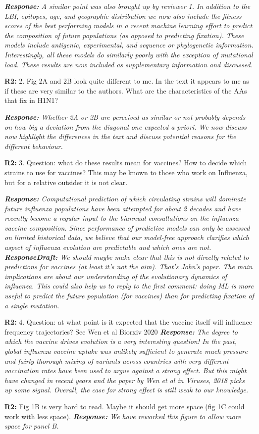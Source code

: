 \documentclass[aps,rmp,onecolumn]{revtex4-1}
\newcommand{\refb}[1]{\textbf{R2:} #1\vskip 5mm}
\newcommand{\response}[1]{{\it {\color{response}\textbf{Response:} #1}}\vskip 5mm}
\newcommand{\responsedraft}[1]{{\it {\color{purple}\textbf{ResponseDraft:} #1}}\vskip 5mm}
\begin{document}
\response{
	A similar point was also brought up by reviewer 1.
	In addition to the LBI, epitopes, age, and geographic distribution we now also include the fitness scores of the best performing models in a recent machine learning effort to predict the composition of future populations (as opposed to predicting fixation).
	These models include antigenic, experimental, and sequence or phylogenetic information.
	Interestingly, all these models do similarly poorly with the exception of mutational load.
	These results are now included as supplementary information and discussed.
}

\refb{2. Fig 2A and 2B look quite different to me. In the text it appears to me as if these are very similar to the authors. What are the characteristics of the AAs that fix in H1N1? }

\response{Whether 2A or 2B are perceived as similar or not probably depends on how big a deviation from the diagonal one expected a priori.
We now discuss now highlight the differences in the text and discuss potential reasons for the different behaviour.  }

\refb{3. Question: what do these results mean for vaccines? How to decide which strains to use for vaccines? This may be known to those who work on Influenza, but for a relative outsider it is not clear. }

\response{
	Computational prediction of which circulating strains will dominate future influenza populations have been attempted for about 2 decades and have recently become a regular input to the biannual consultations on the influenza vaccine composition.
	Since performance of predictive models can only be assessed on limited historical data, we believe that our model-free approach clarifies which aspect of influenza evolution are predictable and which ones are not.
}
\responsedraft{We should maybe make clear that this is not directly related to predictions for vaccines (at least it's not the aim). 
That's John's paper. 
The main implications are about our understanding of the evolutionary dynamics of influenza. 
This could also help us to reply to the first comment: doing ML is more useful to predict the future population (for vaccines) than for predicting fixation of a single mutation. }

\refb{4. Question: at what point is it expected that the vaccine itself will influence frequency trajectories? See Wen et al Biorxiv 2020}
\response{
	The degree to which the vaccine drives evolution is a very interesting question!
	In the past, global influenza vaccine uptake was unlikely sufficient to generate much pressure and fairly thorough mixing of variants across countries with very different vaccination rates have been used to argue against a strong effect. But this might have changed in recent years and the paper by Wen et al in Viruses, 2018 picks up some signal.
	Overall, the case for strong effect is still weak to our knowledge.
}

\refb{Fig 1B is very hard to read. Maybe it should get more space (fig 1C could work with less space).}
\response{We have reworked this figure to allow more space for panel B.}
\end{document}
